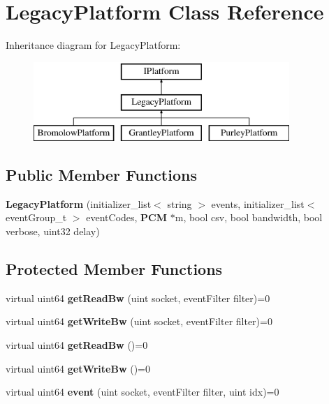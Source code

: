 \section{Legacy\+Platform Class Reference}
\label{classLegacyPlatform}
Inheritance diagram for Legacy\+Platform\+:\begin{figure}[H]
\begin{center}
\leavevmode
\includegraphics[height=3.000000cm]{classLegacyPlatform}
\end{center}
\end{figure}
\subsection*{Public Member Functions}
\begin{DoxyCompactItemize}
\item 
\mbox{\label{classLegacyPlatform_a88e8b4dea31f9b7654fdf3b17e418e11}} 
{\bfseries Legacy\+Platform} (initializer\+\_\+list$<$ string $>$ events, initializer\+\_\+list$<$ event\+Group\+\_\+t $>$ event\+Codes, \textbf{ P\+CM} $\ast$m, bool csv, bool bandwidth, bool verbose, uint32 delay)
\end{DoxyCompactItemize}
\subsection*{Protected Member Functions}
\begin{DoxyCompactItemize}
\item 
\mbox{\label{classLegacyPlatform_a67c7d2a2a6bc319a914732ad89a13476}} 
virtual uint64 {\bfseries get\+Read\+Bw} (uint socket, event\+Filter filter)=0
\item 
\mbox{\label{classLegacyPlatform_afa6b156e541142777f5bb96dbfae4b63}} 
virtual uint64 {\bfseries get\+Write\+Bw} (uint socket, event\+Filter filter)=0
\item 
\mbox{\label{classLegacyPlatform_ad2ffc666c99dc04a66dc34fab59c759e}} 
virtual uint64 {\bfseries get\+Read\+Bw} ()=0
\item 
\mbox{\label{classLegacyPlatform_ac211df0ad55b4345ef5bcc46929cf16a}} 
virtual uint64 {\bfseries get\+Write\+Bw} ()=0
\item 
\mbox{\label{classLegacyPlatform_a3c80d78f33c4cdb67216c6758d948123}} 
virtual uint64 {\bfseries event} (uint socket, event\+Filter filter, uint idx)=0
\end{DoxyCompactItemize}
